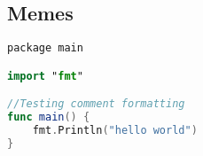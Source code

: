 \goColor
\subsection{Memes}

    \begin{lstlisting}[language=swift]
package main

import "fmt"

//Testing comment formatting
func main() {
    fmt.Println("hello world")
}
    \end{lstlisting}
